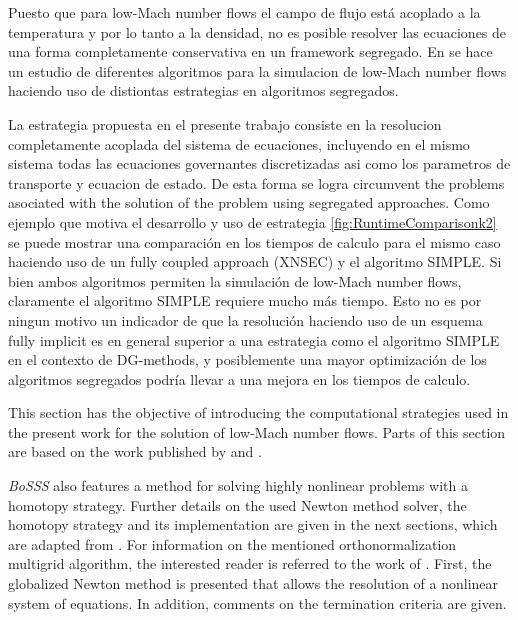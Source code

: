 Puesto que para low-Mach number flows el campo de flujo está acoplado a la temperatura y por lo tanto a la densidad, no es posible resolver las ecuaciones de una forma completamente conservativa en un framework segregado.  En \textcite{knikkerComparativeStudyHighorder2011} se hace un estudio de diferentes algoritmos para la simulacion de low-Mach number flows haciendo uso de distiontas estrategias en algoritmos segregados. 


La estrategia propuesta en el presente trabajo consiste en la resolucion completamente acoplada del sistema de ecuaciones, incluyendo en el mismo sistema todas las ecuaciones governantes discretizadas asi como los parametros de transporte y ecuacion de estado. De esta forma se logra circumvent the problems asociated with the solution of the problem using segregated approaches. Como ejemplo que motiva el desarrollo y uso de estrategia \cref{fig:RuntimeComparisonk2} se puede mostrar una comparación en los tiempos de calculo para el mismo caso haciendo uso de un fully coupled approach (XNSEC) y el algoritmo SIMPLE. Si bien ambos algoritmos permiten la simulación de low-Mach number flows, claramente el algoritmo SIMPLE requiere mucho más tiempo. Esto no es por ningun motivo un indicador de que la resolución haciendo uso de un esquema fully implicit es en general superior a una estrategia como el algoritmo SIMPLE en el contexto de DG-methods, y posiblemente una mayor optimización de los algoritmos segregados podría llevar a una mejora en los tiempos de calculo.


This section has the objective of introducing the computational strategies used in the present work for the solution of low-Mach number flows. Parts of this section are based on the work published by \textcite{kikkerFullyCoupledHighorder} and \textcite{gutierrez-jorqueraFullyCoupledHigh2022}.

\textit{BoSSS} also features a method for solving highly nonlinear problems with a homotopy strategy.
Further details on the used Newton method solver, the homotopy strategy and its implementation are given in the next sections, which are adapted from \textcite{kikkerFullyCoupledHighorder}. For information on the mentioned orthonormalization multigrid algorithm, the interested reader is referred to the work of \textcite{kummerBoSSSPackageMultigrid2021}.
First, the globalized Newton method is presented that allows the resolution of a nonlinear system of equations. In addition, comments on the termination criteria are given.


